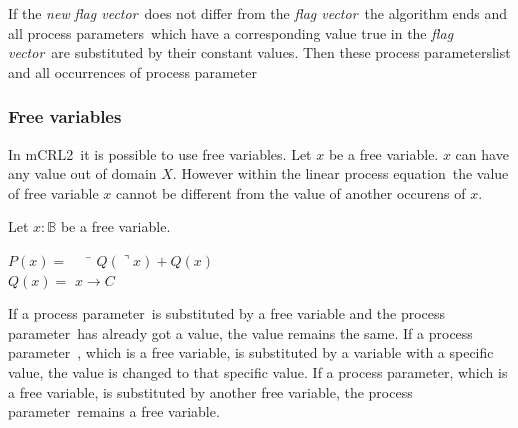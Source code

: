 \documentclass[a4paper,10pt]{article}
\newcommand{\lpe}{linear process equation}
\newcommand{\mcrl}{mCRL2}
\newcommand{\pp}{process parameter}
\newcommand{\pps}{process parameters}
\newcommand{\ti}{\textit}
\newcommand{\fv}{\textit{flag vector}}
\begin{document}
If the \ti{new} \fv\ does not differ from the \fv\ the algorithm ends and all \pps\ which have a corresponding value true in the \fv\ are substituted by their constant values. Then these \pps list and all occurrences of \pp\ 

\subsubsection{Free variables}
In \mcrl\ it is possible to use free variables. %
Let $x$ be a free variable. $x$ can have any value out of domain $X$. However within the \lpe\ the value of free variable $x$ cannot be different from the value of another occurens of $x$.

\begin{example}
Let $x: \mathbb{B}$ be a free variable.
\begin{tabbing}
$P(x) =$ \verb"  " \= $ Q(\urcorner x) + Q(x) $ \\
$Q(x) =$ \> $ x \rightarrow C $\
\end{tabbing}

\end{example}


If a \pp\ is substituted by a free variable and the \pp\ has already got a value, the value remains the same. If a \pp\ , which is a free variable, is substituted by a variable with a specific value, the value is changed to that specific value. If a \pp , which is a free variable, is substituted by another free variable, the \pp\ remains a free variable. 
\end{document}
